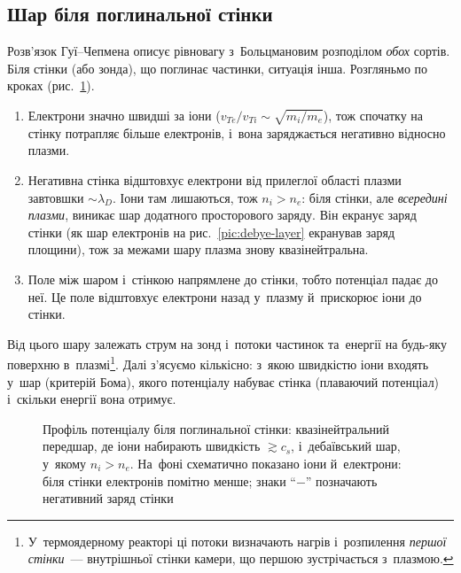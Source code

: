 \subsection*{Шар біля поглинальної стінки}
Розв'язок Гуї--Чепмена описує рівновагу з~Больцмановим розподілом \emph{обох}
сортів. Біля стінки (або зонда), що поглинає частинки, ситуація інша. Розгляньмо по кроках
(рис.~\ref{pic:bohm-sheath}).
\begin{enumerate}
	\item Електрони значно швидші за іони ($v_{Te}/v_{Ti}\sim\sqrt{m_i/m_e}$), тож спочатку на
	стінку потрапляє більше електронів, і~вона заряджається негативно відносно плазми.
	\item Негативна стінка відштовхує електрони від прилеглої області плазми завтовшки
	$\sim\lambda_D$. Іони там лишаються, тож $n_i>n_e$: біля стінки, але \emph{всередині плазми},
	виникає шар додатного просторового заряду. Він екранує заряд стінки (як шар електронів на
	рис.~\ref{pic:debye-layer} екранував заряд площини), тож за межами шару плазма знову квазінейтральна.
	\item Поле між шаром і~стінкою напрямлене до стінки, тобто потенціал падає до неї. Це поле
	відштовхує електрони назад у~плазму й~прискорює іони до стінки.
\end{enumerate}
Від цього шару залежать струм на зонд і~потоки частинок та~енергії на будь-яку поверхню в~плазмі\footnote{У~термоядерному реакторі ці потоки визначають нагрів і~розпилення
\emph{першої стінки}~--- внутрішньої стінки камери, що першою зустрічається з~плазмою.}. Далі з'ясуємо кількісно: з~якою швидкістю
іони входять у~шар (критерій Бома), якого потенціалу набуває стінка (плаваючий потенціал) і~скільки
енергії вона отримує.

\begin{figure}[ht]\centering
	\caption{Профіль потенціалу біля поглинальної стінки: квазінейтральний передшар, де іони
	набирають швидкість $\gtrsim c_s$, і~дебаївський шар, у~якому $n_i>n_e$. На~фоні схематично
	показано іони й~електрони: біля стінки електронів помітно менше; знаки \enquote{$-$} позначають
	негативний заряд стінки}
	\label{pic:bohm-sheath}
\end{figure}

